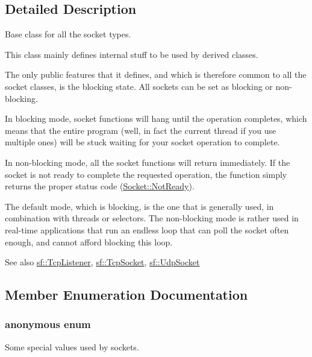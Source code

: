 \subsection{Detailed Description}
Base class for all the socket types. 

This class mainly defines internal stuff to be used by derived classes.

The only public features that it defines, and which is therefore common to all the socket classes, is the blocking state. All sockets can be set as blocking or non-\/blocking.

In blocking mode, socket functions will hang until the operation completes, which means that the entire program (well, in fact the current thread if you use multiple ones) will be stuck waiting for your socket operation to complete.

In non-\/blocking mode, all the socket functions will return immediately. If the socket is not ready to complete the requested operation, the function simply returns the proper status code (\hyperlink{classsf_1_1_socket_a51bf0fd51057b98a10fbb866246176dca8554848daae98f996e131bdeed076c09}{Socket\+::\+Not\+Ready}).

The default mode, which is blocking, is the one that is generally used, in combination with threads or selectors. The non-\/blocking mode is rather used in real-\/time applications that run an endless loop that can poll the socket often enough, and cannot afford blocking this loop.

\begin{DoxySeeAlso}{See also}
\hyperlink{classsf_1_1_tcp_listener}{sf\+::\+Tcp\+Listener}, \hyperlink{classsf_1_1_tcp_socket}{sf\+::\+Tcp\+Socket}, \hyperlink{classsf_1_1_udp_socket}{sf\+::\+Udp\+Socket} 
\end{DoxySeeAlso}


\subsection{Member Enumeration Documentation}
\hypertarget{classsf_1_1_socket_a5deb2c955fd347259c3a20d27b2481aa}{\subsubsection[{anonymous enum}]{\setlength{\rightskip}{0pt plus 5cm}anonymous enum}}\label{classsf_1_1_socket_a5deb2c955fd347259c3a20d27b2481aa}


Some special values used by sockets. 

